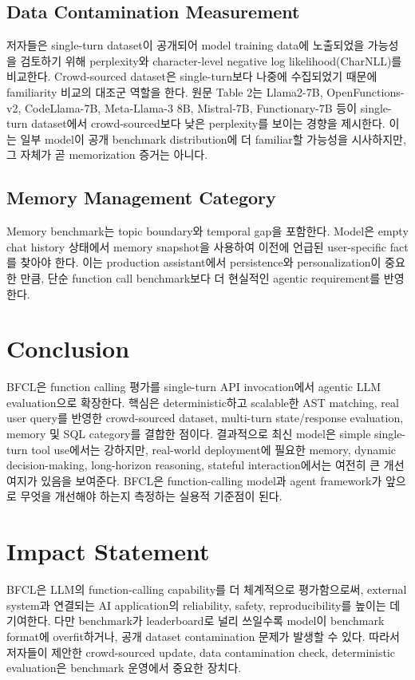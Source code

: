 \documentclass[11pt]{article}
\begin{document}
\subsection{Data Contamination Measurement}
저자들은 single-turn dataset이 공개되어 model training data에 노출되었을 가능성을 검토하기 위해 perplexity와 character-level negative log likelihood(CharNLL)를 비교한다. Crowd-sourced dataset은 single-turn보다 나중에 수집되었기 때문에 familiarity 비교의 대조군 역할을 한다. 원문 Table 2는 Llama2-7B, OpenFunctions-v2, CodeLlama-7B, Meta-Llama-3 8B, Mistral-7B, Functionary-7B 등이 single-turn dataset에서 crowd-sourced보다 낮은 perplexity를 보이는 경향을 제시한다. 이는 일부 model이 공개 benchmark distribution에 더 familiar할 가능성을 시사하지만, 그 자체가 곧 memorization 증거는 아니다.

\subsection{Memory Management Category}
Memory benchmark는 topic boundary와 temporal gap을 포함한다. Model은 empty chat history 상태에서 memory snapshot을 사용하여 이전에 언급된 user-specific fact를 찾아야 한다. 이는 production assistant에서 persistence와 personalization이 중요한 만큼, 단순 function call benchmark보다 더 현실적인 agentic requirement를 반영한다.

\section{Conclusion}
BFCL은 function calling 평가를 single-turn API invocation에서 agentic LLM evaluation으로 확장한다. 핵심은 deterministic하고 scalable한 AST matching, real user query를 반영한 crowd-sourced dataset, multi-turn state/response evaluation, memory 및 SQL category를 결합한 점이다. 결과적으로 최신 model은 simple single-turn tool use에서는 강하지만, real-world deployment에 필요한 memory, dynamic decision-making, long-horizon reasoning, stateful interaction에서는 여전히 큰 개선 여지가 있음을 보여준다. BFCL은 function-calling model과 agent framework가 앞으로 무엇을 개선해야 하는지 측정하는 실용적 기준점이 된다.

\section*{Impact Statement}
BFCL은 LLM의 function-calling capability를 더 체계적으로 평가함으로써, external system과 연결되는 AI application의 reliability, safety, reproducibility를 높이는 데 기여한다. 다만 benchmark가 leaderboard로 널리 쓰일수록 model이 benchmark format에 overfit하거나, 공개 dataset contamination 문제가 발생할 수 있다. 따라서 저자들이 제안한 crowd-sourced update, data contamination check, deterministic evaluation은 benchmark 운영에서 중요한 장치다.
\end{document}
